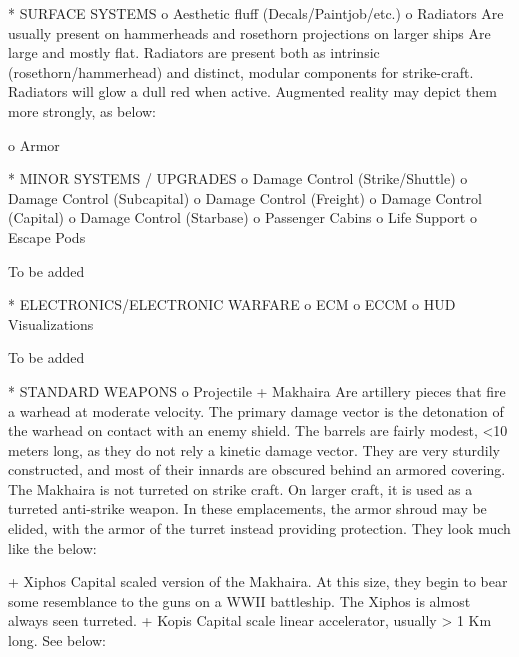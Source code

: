     * SURFACE SYSTEMS
          o Aesthetic fluff (Decals/Paintjob/etc.)
          o Radiators
            Are usually present on hammerheads and rosethorn projections on larger ships
            Are large and mostly flat.
            Radiators are present both as intrinsic (rosethorn/hammerhead) and distinct, modular components for strike-craft.
            Radiators will glow a dull red when active. Augmented reality may depict them more strongly, as below:

          o Armor


    * MINOR SYSTEMS / UPGRADES
          o Damage Control (Strike/Shuttle)
          o Damage Control (Subcapital)
          o Damage Control (Freight)
          o Damage Control (Capital)
          o Damage Control (Starbase)
          o Passenger Cabins
          o Life Support
          o Escape Pods

            To be added



    * ELECTRONICS/ELECTRONIC WARFARE
          o ECM
          o ECCM
          o HUD Visualizations

            To be added


    * STANDARD WEAPONS
          o Projectile
                + Makhaira
                  Are artillery pieces that fire a warhead at moderate velocity. The primary damage vector is the detonation of the warhead on contact with an enemy shield.
                  The barrels are fairly modest, <10 meters long, as they do not rely a kinetic damage vector. They are very sturdily constructed, and most of their innards are obscured behind an armored covering.
                  The Makhaira is not turreted on strike craft.
                  On larger craft, it is used as a turreted anti-strike weapon. In these emplacements, the armor shroud may be elided, with the armor of the turret instead providing protection.
                  They look much like the below:

                + Xiphos
                  Capital scaled version of the Makhaira. At this size, they begin to bear some resemblance to the guns on a WWII battleship. The Xiphos is almost always seen turreted.
                + Kopis
                  Capital scale linear accelerator, usually > 1 Km long.
                  See below:

